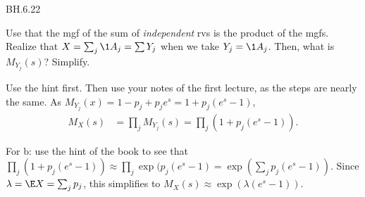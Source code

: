 
\setcounter{theorem}{21}
\begin{exercise} BH.6.22

\begin{hint}
Use that the mgf of the sum of \emph{independent} rvs is the product of the mgfs.  Realize that  $X=\sum_j \1{A_j} = \sum Y_{j}$ when we take $Y_j=\1{A_{j}}$. Then, what is $M_{Y_j}(s)$? Simplify.
\end{hint}

\begin{solution}
Use the hint first. Then use your notes of the first lecture, as the steps are nearly the same.
As $M_{Y_j}(x) = 1-p_j + p_je^{s} = 1 + p_j(e^s-1)$,
\begin{align*}
  M_X(s) &= \prod_j M_{Y_j}(s) = \prod_{j} (1+p_j(e^s-1)).
\end{align*}

For b: use the hint of the book to see that $\prod_{j} (1+p_j(e^s-1)) \approx \prod_j \exp(p_j(e^s-1) = \exp\left(\sum_j p_j (e^s-1)\right)$.
Since $\lambda = \E X = \sum_jp_j$, this simplifies to $M_X(s) \approx \exp(\lambda(e^s-1))$.

\end{solution}


\end{exercise}

